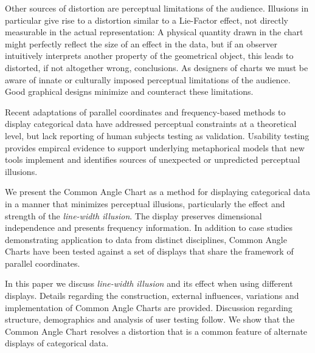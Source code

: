 Other sources of distortion are perceptual limitations of the audience. Illusions in particular give rise to a distortion similar to a Lie-Factor effect, not directly measurable in the actual representation: A physical quantity drawn in the chart might  perfectly reflect the  size of an effect in the data, but if an observer  intuitively interprets another property of the geometrical object, this leads  to distorted, if not altogether wrong, conclusions. As designers of charts we must be aware of innate or culturally imposed perceptual limitations of the audience. Good graphical designs minimize and counteract these limitations. 


Recent adaptations of parallel coordinates \citep{pcp:1885, inselberg:1985, wegman:1990} and frequency-based methods to display categorical data \citep{hartigan:1981, friendly:1992, hofmann:2000, theus:1997, kosara:2006, bendix:2005, leblanc:1990, 
spenke:2003}  have addressed perceptual constraints \citep{cleveland:1984} at a theoretical level, but lack reporting of human subjects testing as validation. Usability testing provides empircal evidence to support underlying metaphorical models that new tools implement and identifies sources of unexpected or unpredicted perceptual illusions.


We present the Common Angle Chart as a method for displaying categorical data in a manner that minimizes perceptual illusions, particularly the effect and strength of the {\it line-width illusion}. The display preserves dimensional independence and presents frequency information. In addition to case studies demonstrating application to data from distinct disciplines, Common Angle Charts have been tested against a set of  displays that share the framework of parallel coordinates.

In this paper we discuss {\it line-width illusion} and its effect when using different displays. Details regarding the construction, external influences, variations and implementation of Common Angle Charts are provided. Discussion regarding structure, demographics and analysis of user testing follow. We show that the Common Angle Chart resolves a distortion that is a common feature of alternate displays of categorical data.


